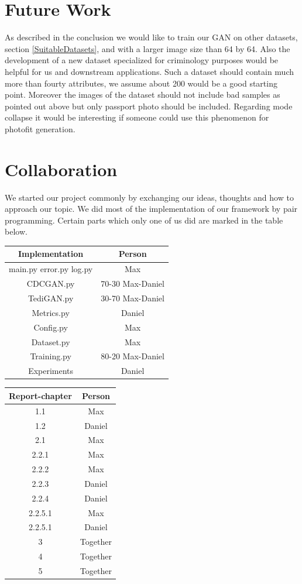 \documentclass[12pt, a4paper]{article}
\begin{document}
\section{Future Work}
As described in the conclusion we would like to train our GAN on other datasets, section \ref{SuitableDatasets}, and with a larger image size than 64 by 64. 
Also the development of a new dataset specialized for criminology purposes would be helpful for us and downstream applications.
Such a dataset should contain much more than fourty attributes, we assume about 200 would be a good starting point. Moreover the images of the dataset should not include bad samples as pointed out above but only passport photo should be included.
Regarding mode collapse it would be interesting if someone could use this phenomenon for photofit generation.
\section{Collaboration}
We started our project commonly by exchanging our ideas, thoughts and how to approach our topic.
We did most of the implementation of our framework by pair programming. Certain parts which only one of us did are marked in the table below.
\begin{table}[h]
\centering
    \begin{tabular}{|c|c|}
        \hline
        Implementation & Person \\        
        \hline
        main.py error.py log.py & Max\\
        CDCGAN.py & 70-30 Max-Daniel\\
        TediGAN.py & 30-70 Max-Daniel\\
        Metrics.py & Daniel\\
        Config.py & Max\\
        Dataset.py & Max\\
        Training.py & 80-20 Max-Daniel\\
        Experiments & Daniel\\
        \hline
    \end{tabular} 
\end{table}
\begin{table}[h]
\centering
    \begin{tabular}{|c|c|}
        \hline
        Report-chapter & Person \\        
        \hline
        1.1 & Max \\
        1.2 & Daniel \\
        2.1 & Max \\
        2.2.1 & Max \\
        2.2.2 & Max \\
        2.2.3 & Daniel \\
        2.2.4 & Daniel \\
        2.2.5.1 & Max \\
        2.2.5.1 & Daniel \\
        3 & Together \\
        4 & Together \\
        5 & Together \\
        \hline
    \end{tabular}
\end{table}

\nocite{*}


\end{document}
